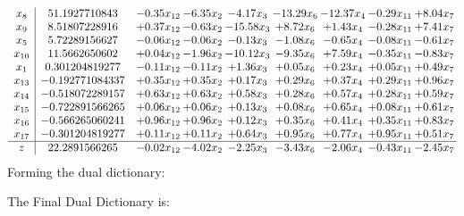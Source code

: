\documentclass[8pt]{article}
\begin{document}
\[\begin{array}{c| c c@{\hskip 2pt} c@{\hskip 2pt} c@{\hskip 2pt} c@{\hskip 2pt} c@{\hskip 2pt} c@{\hskip 2pt} c@{\hskip 2pt} }
 x_{8}   &  51.1927710843 & -0.35 x_{12} & -6.35 x_{2} & -4.17 x_{3} & -13.29 x_{6} & -12.37 x_{4} & -0.29 x_{11} & +  8.04 x_{7}\\
 x_{9}   &  8.51807228916 & +  0.37 x_{12} & -0.63 x_{2} & -15.58 x_{3} & +  8.72 x_{6} & +  1.43 x_{4} & -0.28 x_{11} & +  7.41 x_{7}\\
 x_{5}   &  5.72289156627 & -0.06 x_{12} & -0.06 x_{2} & -0.13 x_{3} & -1.08 x_{6} & -0.65 x_{4} & -0.08 x_{11} & -0.61 x_{7}\\
 x_{10}   &  11.5662650602 & +  0.04 x_{12} & -1.96 x_{2} & -10.12 x_{3} & -9.35 x_{6} & +  7.59 x_{4} & -0.35 x_{11} & -0.83 x_{7}\\
 x_{1}   &  0.301204819277 & -0.11 x_{12} & -0.11 x_{2} & +  1.36 x_{3} & +  0.05 x_{6} & +  0.23 x_{4} & +  0.05 x_{11} & +  0.49 x_{7}\\
 x_{13}   &  -0.192771084337 & +  0.35 x_{12} & +  0.35 x_{2} & +  0.17 x_{3} & +  0.29 x_{6} & +  0.37 x_{4} & +  0.29 x_{11} & +  0.96 x_{7}\\
 x_{14}   &  -0.518072289157 & +  0.63 x_{12} & +  0.63 x_{2} & +  0.58 x_{3} & +  0.28 x_{6} & +  0.57 x_{4} & +  0.28 x_{11} & +  0.59 x_{7}\\
 x_{15}   &  -0.722891566265 & +  0.06 x_{12} & +  0.06 x_{2} & +  0.13 x_{3} & +  0.08 x_{6} & +  0.65 x_{4} & +  0.08 x_{11} & +  0.61 x_{7}\\
 x_{16}   &  -0.566265060241 & +  0.96 x_{12} & +  0.96 x_{2} & +  0.12 x_{3} & +  0.35 x_{6} & +  0.41 x_{4} & +  0.35 x_{11} & +  0.83 x_{7}\\
 x_{17}   &  -0.301204819277 & +  0.11 x_{12} & +  0.11 x_{2} & +  0.64 x_{3} & +  0.95 x_{6} & +  0.77 x_{4} & +  0.95 x_{11} & +  0.51 x_{7}\\
\hline
z    &  22.2891566265 & -0.02 x_{12} & -4.02 x_{2} & -2.25 x_{3} & -3.43 x_{6} & -2.06 x_{4} & -0.43 x_{11} & -2.45 x_{7}\\
\end{array}\]
Forming the dual dictionary:

The Final Dual Dictionary is: 
\end{document}
